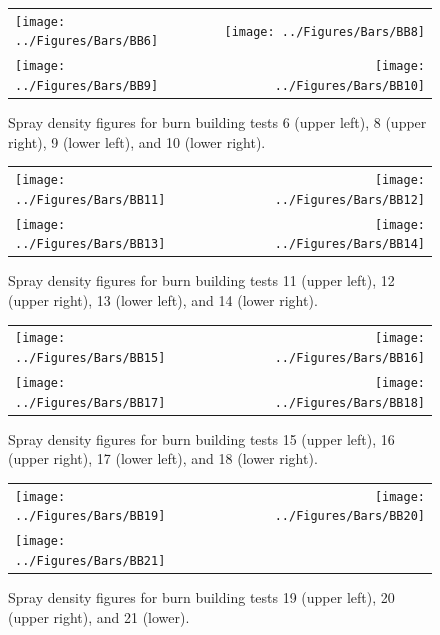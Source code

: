 \documentclass[12pt,oneside]{book}
\begin{document}
\begin{figure}[ht]
\begin{tabular*}{\textwidth}{lr}
\texttt{[image: ../Figures/Bars/BB6]} &
\texttt{[image: ../Figures/Bars/BB8]} \\
\texttt{[image: ../Figures/Bars/BB9]} &
\texttt{[image: ../Figures/Bars/BB10]}
\end{tabular*}
\caption{Spray density figures for burn building tests 6 (upper left), 8 (upper right), 9 (lower left), and 10 (lower right).}
\label{fig:bb_6_10}
\end{figure}

\clearpage

\begin{figure}[ht]
\begin{tabular*}{\textwidth}{lr}
\texttt{[image: ../Figures/Bars/BB11]} &
\texttt{[image: ../Figures/Bars/BB12]} \\
\texttt{[image: ../Figures/Bars/BB13]} &
\texttt{[image: ../Figures/Bars/BB14]}
\end{tabular*}
\caption{Spray density figures for burn building tests 11 (upper left), 12 (upper right), 13 (lower left), and 14 (lower right).}
\label{fig:bb_11_14}
\end{figure}

\clearpage

\begin{figure}[ht]
\begin{tabular*}{\textwidth}{lr}
\texttt{[image: ../Figures/Bars/BB15]} &
\texttt{[image: ../Figures/Bars/BB16]} \\
\texttt{[image: ../Figures/Bars/BB17]} &
\texttt{[image: ../Figures/Bars/BB18]}
\end{tabular*}
\caption{Spray density figures for burn building tests 15 (upper left), 16 (upper right), 17 (lower left), and 18 (lower right).}
\label{fig:bb_15_18}
\end{figure}

\clearpage

\begin{figure}[ht]
\begin{tabular*}{\textwidth}{lr}
\texttt{[image: ../Figures/Bars/BB19]} &
\texttt{[image: ../Figures/Bars/BB20]} \\
\texttt{[image: ../Figures/Bars/BB21]} \\
\end{tabular*}
\caption{Spray density figures for burn building tests 19 (upper left), 20 (upper right), and 21 (lower).}
\label{fig:bb_19_21}
\end{figure}
\end{document}
